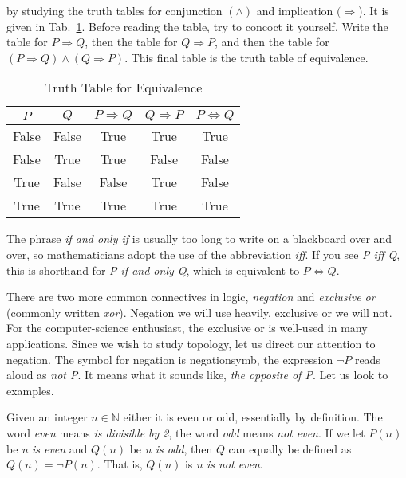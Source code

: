             by studying the truth tables for conjunction $(\land)$ and
            implication $(\Rightarrow$). It is given in
            Tab.~\ref{tab:truth_table_equivalence}. Before reading the table,
            try to concoct it yourself. Write the table for $P\Rightarrow{Q}$,
            then the table for $Q\Rightarrow{P}$, and then the table for
            $(P\Rightarrow{Q})\land(Q\Rightarrow{P})$. This final table is the
            truth table of equivalence.
            \begin{table}[H]
                \centering
                \begin{tabular}{c | c | c | c | c}
                    $P$&$Q$&$P\Rightarrow{Q}$&
                        $Q\Rightarrow{P}$&$P\Leftrightarrow{Q}$\\
                    \hline
                    False&False&True&True&True\\
                    \hline
                    False&True&True&False&False\\
                    \hline
                    True&False&False&True&False\\
                    \hline
                    True&True&True&True&True
                \end{tabular}
                \caption{Truth Table for Equivalence}
                \label{tab:truth_table_equivalence}
            \end{table}
            The phrase \textit{if and only if} is usually too long to write on
            a blackboard over and over, so mathematicians adopt the use of the
            abbreviation \textit{iff}. If you see \textit{P iff Q}, this is
            shorthand for \textit{P if and only Q}, which is equivalent to
            $P\Leftrightarrow{Q}$.
            \par\hfill\par
            There are two more common connectives in logic, \textit{negation}%
            and \textit{exclusive or} (commonly written \textit{xor}). Negation
            we will use heavily, exclusive or we will not. For the
            computer-science enthusiast, the exclusive or is well-used in many
            applications. Since we wish to study topology, let us direct our
            attention to negation. The symbol for negation is
            \gls{negationsymb}, the
            expression $\neg{P}$ reads aloud as \textit{not P}. It means what it
            sounds like, \textit{the opposite of P}. Let us look to examples.
            \begin{example}
                Given an integer $n\in\mathbb{N}$ either it is even or odd,
                essentially by definition. The word \textit{even} means
                \textit{is divisible by 2}, the word \textit{odd} means
                \textit{not even}. If we let $P(n)$ be \textit{n is even} and
                $Q(n)$ be \textit{n is odd}, then $Q$ can equally be defined as
                $Q(n)=\neg{P}(n)$. That is, $Q(n)$ is \textit{n is not even}.
            \end{example}
